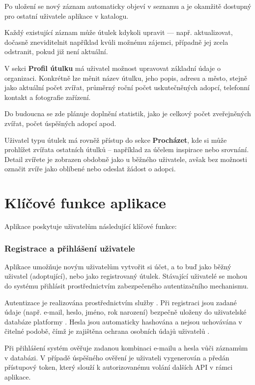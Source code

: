 \documentclass[czech, bp, kiv, he, iso690numb, pdf]{fasthesis}
\begin{document}
    Po uložení se nový záznam automaticky objeví v seznamu a je okamžitě dostupný pro ostatní uživatele aplikace v katalogu.

    Každý existující záznam může útulek kdykoli upravit — např. aktualizovat, dočasně zneviditelnit například kvůli možnému zájemci, případně jej zcela odstranit, pokud již není aktuální.

    V sekci \textbf{Profil útulku} má uživatel možnost upravovat základní údaje o organizaci. Konkrétně lze měnit název útulku, jeho popis, adresu a město, stejně jako aktuální počet zvířat, průměrný roční počet uskutečněných adopcí, telefonní kontakt a fotografie zařízení.

    Do budoucna se zde plánuje doplnění statistik, jako je celkový počet zveřejněných zvířat, počet úspěšných adopcí apod.

    Uživatel typu útulek má rovněž přístup do sekce \textbf{Procházet}, kde si může prohlížet zvířata ostatních útulků – například za účelem inspirace nebo srovnání. Detail zvířete je zobrazen obdobně jako u běžného uživatele, avšak bez možnosti označit zvíře jako oblíbené nebo odeslat žádost o adopci.

    \section{Klíčové funkce aplikace}
    Aplikace poskytuje uživatelům následující klíčové funkce:

    \subsubsection*{Registrace a přihlášení uživatele}

    Aplikace umožňuje novým uživatelům vytvořit si účet, a to buď jako běžný uživatel (adoptující), nebo jako registrovaný útulek. Stávající uživatelé se mohou do systému přihlásit prostřednictvím zabezpečeného autentizačního mechanismu.

    Autentizace je realizována prostřednictvím služby . Při registraci jsou zadané údaje (např. e-mail, heslo, jméno, rok narození) bezpečně uloženy do uživatelské databáze platformy . Hesla jsou automaticky hashována a nejsou uchovávána v čitelné podobě, čímž je zajištěna ochrana osobních údajů uživatelů \cite{appwrite-auth}.

    Při přihlášení systém ověřuje zadanou kombinaci e-mailu a hesla vůči záznamům v databázi. V případě úspěšného ověření je uživateli vygenerován a předán přístupový token, který slouží k autorizovanému volání dalších API v rámci aplikace.
\end{document}
